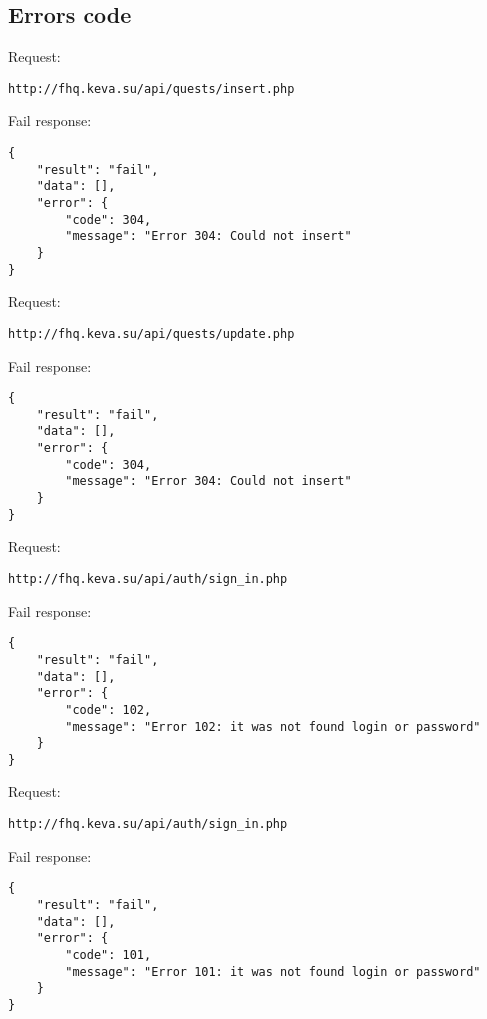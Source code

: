 \subsection{Errors code }
\label{sec:code_errors}
\par

\begin{center}
\end{center}



Request:
\begin{Verbatim}[frame=single]
http://fhq.keva.su/api/quests/insert.php
\end{Verbatim}
Fail response:
\begin{Verbatim}[frame=single]
{
    "result": "fail",
    "data": [],
    "error": {
        "code": 304,
        "message": "Error 304: Could not insert"
    }
}
\end{Verbatim}

Request:
\begin{Verbatim}[frame=single]
http://fhq.keva.su/api/quests/update.php
\end{Verbatim}
Fail response:
\begin{Verbatim}[frame=single]
{
    "result": "fail",
    "data": [],
    "error": {
        "code": 304,
        "message": "Error 304: Could not insert"
    }
}
\end{Verbatim}


Request:
\begin{Verbatim}[frame=single]
http://fhq.keva.su/api/auth/sign_in.php
\end{Verbatim}
Fail response:
\begin{Verbatim}[frame=single]
{
    "result": "fail",
    "data": [],
    "error": {
        "code": 102,
        "message": "Error 102: it was not found login or password"
    }
}
\end{Verbatim}



Request:
\begin{Verbatim}[frame=single]
http://fhq.keva.su/api/auth/sign_in.php
\end{Verbatim}
Fail response:
\begin{Verbatim}[frame=single]
{
    "result": "fail",
    "data": [],
    "error": {
        "code": 101,
        "message": "Error 101: it was not found login or password"
    }
}
\end{Verbatim}

